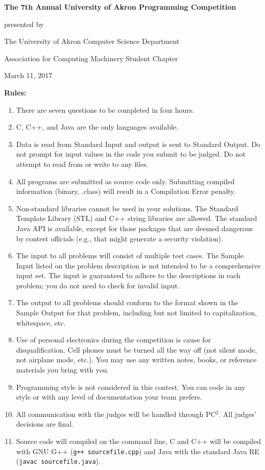 \begin{center}
\large
\textbf{The 7th Annual University of Akron Programming Competition}

\vspace{.25in}

presented by

The University of Akron Computer Science Department

Association for Computing Machinery Student Chapter

\vspace{.25in}

March 11, 2017
\end{center}

\textbf{Rules:}
\begin{enumerate} \itemsep10pt \parskip0pt 
\item There are seven questions to be completed in four hours.
\item C, C++, and Java are the only languages available.
\item Data is read from Standard Input and output is sent to Standard Output. Do not prompt for input values in the code you submit to be judged. Do not attempt to read from or write to any files.
\item All programs are submitted as source code only. Submitting compiled information (binary, .class) will result in a Compilation Error penalty.
\item Non-standard libraries cannot be used in your solutions. The Standard Template Library (STL) and C++ string libraries are allowed. The standard Java API is available, except for those packages that are deemed dangerous by contest officials (e.g., that might generate a security violation).
\item The input to all problems will consist of multiple test cases. The Sample Input listed on the problem description is not intended to be a comprehensive input set. The input is guaranteed to adhere to the descriptions in each problem; you do not need to check for invalid input.
\item The output to all problems should conform to the format shown in the Sample Output for that problem, including but not limited to capitalization, whitespace, etc.
\item Use of personal electronics during the competition is cause for disqualification. Cell phones must be turned all the way off (not silent mode, not airplane mode, etc.). You may use any written notes, books, or reference materials you bring with you.
\item Programming style is not considered in this contest. You can code in any style or with any level of documentation your team prefers.
\item All communication with the judges will be handled through PC$^2$. All judges’ decisions are final.
\item Source code will compiled on the command line, C and C++ will be compiled with GNU G++ (\texttt{g++ sourcefile.cpp}) and Java with the standard Java RE (\texttt{javac sourcefile.java}).
\end{enumerate}
